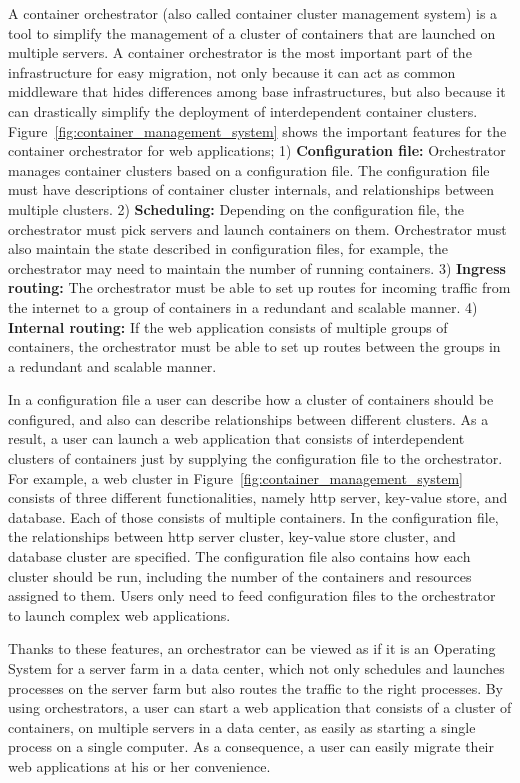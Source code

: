 A container orchestrator (also called container cluster management system) is a tool to simplify the management of a cluster of containers that are launched on multiple servers.
A container orchestrator is the most important part of the infrastructure for easy migration, not only because it can act as common middleware that hides differences among base infrastructures, but also because it can drastically simplify the deployment of interdependent container clusters.
Figure~\ref{fig:container_management_system} shows the important features for the container orchestrator for web applications;
1) {\bf Configuration file:} Orchestrator manages container clusters based on a configuration file. 
The configuration file must have descriptions of container cluster internals, and relationships between multiple clusters.
2) {\bf Scheduling:} Depending on the configuration file, the orchestrator must pick servers and launch containers on them.
Orchestrator must also maintain the state described in configuration files, for example, the orchestrator may need to maintain the number of running containers.
3) {\bf Ingress routing:} The orchestrator must be able to set up routes for incoming traffic from the internet to a group of containers in a redundant and scalable manner.
4) {\bf Internal routing:} If the web application consists of multiple groups of containers, the orchestrator must be able to set up routes between the groups in a redundant and scalable manner.

In a configuration file a user can describe how a cluster of containers should be configured, and also can describe relationships between different clusters.
As a result, a user can launch a web application that consists of interdependent clusters of containers just by supplying the configuration file to the orchestrator.
For example, a web cluster in Figure~\ref{fig:container_management_system} consists of three different functionalities, namely http server, key-value store, and database.
Each of those consists of multiple containers.
In the configuration file, the relationships between http server cluster, key-value store cluster, and database cluster are specified.
The configuration file also contains how each cluster should be run, including the number of the containers and resources assigned to them.
Users only need to feed configuration files to the orchestrator to launch complex web applications.

Thanks to these features, an orchestrator can be viewed as if it is an Operating System for a server farm in a data center, which not only schedules and launches processes on the server farm but also routes the traffic to the right processes.
By using orchestrators, a user can start a web application that consists of a cluster of containers, on multiple servers in a data center, as easily as starting a single process on a single computer.
As a consequence, a user can easily migrate their web applications at his or her convenience.

